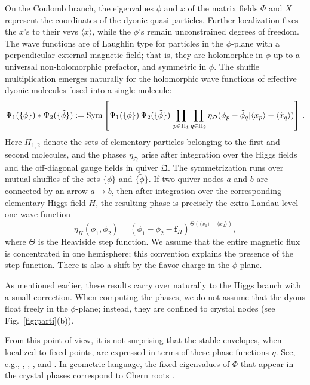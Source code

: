 \documentclass[10pt]{article}
\theoremstyle{definition}
\def\fQ{\mathfrak{Q}}
\def\lm{\limits}
\numberwithin{equation}{section}
\begin{document}
On the Coulomb branch, the eigenvalues $\phi$ and $x$ of the matrix fields $\Phi$ and $X$ represent the coordinates of the dyonic quasi-particles.
Further localization fixes the $x$'s to their vevs $\langle x\rangle$, while the $\phi$'s remain unconstrained degrees of freedom.
The wave functions are of Laughlin type for particles in the $\phi$-plane with a perpendicular external magnetic field; that is, they are holomorphic in $\phi$ up to a universal non-holomorphic prefactor, and symmetric in $\phi$.
The shuffle multiplication emerges naturally for the holomorphic wave functions of effective dyonic molecules fused into a single molecule:
\begin{equation}
	\Psi_1(\{\phi\})*\Psi_2(\{\tilde\phi\}):={\rm Sym}\left[\Psi_1(\{\phi\})\,\Psi_2(\{\tilde\phi\})\,\prod\lm_{p\in \Pi_{1}}\prod\lm_{q\in \Pi_{2}}\eta_{\fQ}(\phi_{p}-\tilde\phi_{q}|\langle x_p\rangle-\langle \tilde x_q\rangle)\right]\,.
\end{equation}
Here $\Pi_{1,2}$ denote the sets of elementary particles belonging to the first and second molecules, and the phases $\eta_{\fQ}$ arise after integration over the Higgs fields and the off-diagonal gauge fields in quiver $\fQ$.
The symmetrization runs over mutual shuffles of the sets $\{\phi\}$ and $\{\tilde\phi\}$.
If two quiver nodes $a$ and $b$ are connected by an arrow $a\to b$, then after integration over the corresponding elementary Higgs field $H$, the resulting phase is precisely the extra Landau-level-one wave function
\begin{equation}
	\eta_H(\phi_1,\phi_2)=(\phi_1-\phi_2-\mathbf{f}_H)^{\Theta(\langle x_1\rangle-\langle x_2\rangle)},
\end{equation}
where $\Theta$ is the Heaviside step function.
We assume that the entire magnetic flux is concentrated in one hemisphere; this convention explains the presence of the step function.
There is also a shift by the flavor charge in the $\phi$-plane.

As mentioned earlier, these results carry over naturally to the Higgs branch with a small correction.
When computing the phases, we do not assume that the dyons float freely in the $\phi$-plane; instead, they are confined to crystal nodes (see Fig.~\ref{fig:parti}(b)).

From this point of view, it is not surprising that the stable envelopes, when localized to fixed points, are expressed in terms of these phase functions $\eta$.
See, e.g., \cite[Thm.~5.2.1, Prop.~5.3.1]{Shenfeld:2013abc}, \cite[eq.~(48)]{Smirnov:2019abc}, \cite[Sec.~4.4.5]{Aganagic:2021abc}, and \cite[Sec.~2.3]{Bullimore:2017lwu}.
In geometric language, the fixed eigenvalues of $\Phi$ that appear in the crystal phases correspond to Chern roots \cite{Zhou:2021vcb,Ueda:2020csb}.
\end{document}

